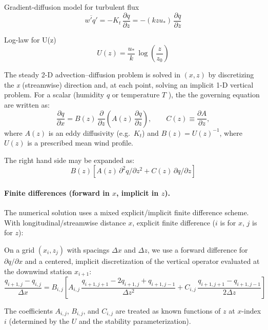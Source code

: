 \documentclass{article}
\begin{document}
    Gradient-diffusion model for turbulent flux
    $$
    \overline{w' q'}
    = -K_t\,\frac{\partial q}{\partial z}
    = -(k z u_*)\,\frac{\partial q}{\partial z}
    $$
    
    Log-law for U(z)
    $$
    U(z)=\frac{u_*}{k}\,\log\!\left(\frac{z}{z_0}\right)
    $$
    
    The steady 2-D advection--diffusion problem is solved in $(x,z)$ by discretizing the
    \textit{x} (streamwise) direction and, at each point, solving an implicit 1-D vertical problem.
    For a  scalar (humidity $q$ or temperature $T$ ), the the governing equation are written as: 
    \begin{equation}
    \frac{\partial q}{\partial x}
    =
    B(z)\,\frac{\partial}{\partial z}\!\left(A(z)\,\frac{\partial q}{\partial z}\right),
    \qquad
    C(z)\equiv \frac{\partial A}{\partial z},
    \end{equation}
    where $A(z)$ is an eddy diffusivity (e.g.\ $K_t$) and
    $B(z)=U(z)^{-1}$, where $U(z)$ is a prescribed mean wind profile. 
    
    The right hand side may be expanded as:
    $$B(z)\left[A(z)\,\partial^2 q/\partial z^2 + C(z)\,\partial q/\partial z\right]$$
    \paragraph{Finite differences (forward in $x$, implicit in $z$).}
    
    The numerical solution uses a mixed explicit/implicit finite difference scheme. 
    With longitudinal/streamwise distance $x$,  explicit finite difference ($i$ is for $x$, $j$ is for $z$):
    
    On a grid $(x_i,z_j)$ with spacings $\Delta x$ and $\Delta z$, we use a forward difference for $\partial q/\partial x$ and a centered, implicit discretization of the vertical operator
    evaluated at the downwind station $x_{i+1}$:
    \begin{equation}
    \frac{q_{i+1,j}-q_{i,j}}{\Delta x}
    =
    B_{i,j}
    \left[
    A_{i,j}\,\frac{q_{i+1,j+1}-2q_{i+1,j}+q_{i+1,j-1}}{\Delta z^2}
    +
    C_{i,j}\,\frac{q_{i+1,j+1}-q_{i+1,j-1}}{2\Delta z}
    \right]
    \label{eq:scheme}
    \end{equation}
    
    The coefficients $A_{i,j}$, $B_{i,j}$, and $C_{i,j}$ are treated as known functions of $z$ at $x$-index $i$ 
    (determined by the $U$ and the stability parameterization).
    
\end{document}

